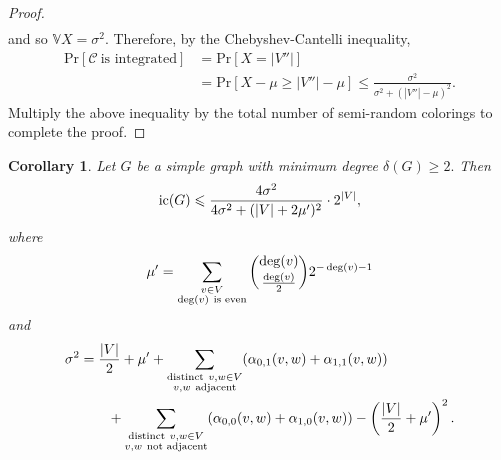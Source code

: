 \documentclass[11pt, reqno]{amsart}
\newtheorem{corollary}[theorem]{Corollary}
\theoremstyle{definition}
\renewcommand{\leq}{\leqslant}
\renewcommand{\geq}{\geqslant}
\begin{document}
\begin{proof}
\begin{align}
\end{align}
and so $\mathbb{V}X = \sigma^2.$ Therefore, by the Chebyshev-Cantelli inequality,
\begin{align}
\text{Pr}[\mathcal{C}\ \text{is integrated}] &= \text{Pr}[X = |V''|]
\\ &= \text{Pr}[X - \mu \geq |V''| - \mu] \leq \frac{\sigma^2}{\sigma^2+(|V''|-\mu)^2}.
\end{align}
Multiply the above inequality by the total number of semi-random colorings to complete the proof.
\end{proof}

\begin{corollary}
\label{mindegree}
Let $G$ be a simple graph with minimum degree $\delta(G) \geq 2.$ Then
\[\textup{ic}(G) \leq \frac{4\sigma^2}{4\sigma^2+(|V|+2\mu')^2}\cdot2^{|V|},\]
where
\[\mu' = \sum_{\substack{v \in V\\ \deg(v)\ \textup{is even}}} \binom{\deg(v)}{\frac{\deg(v)}{2}}2^{-\deg(v)-1}\]
and
\begin{align*}
\sigma^2 &= \frac{|V|}{2}+\mu' + \sum_{\substack{\textup{distinct}\ v, w \in V \\ v,w\ \textup{adjacent}}}(\alpha_{0,1}(v,w) + \alpha_{1,1}(v,w)) 
\\ & \hspace{2em}+ \sum_{\substack{\textup{distinct}\ v, w \in V \\ v,w\ \textup{not adjacent}}} (\alpha_{0,0}(v,w) + \alpha_{1,0}(v,w)) - \left(\frac{|V|}{2}+\mu'\right)^2.
\end{align*}
\end{corollary}
\end{document}
